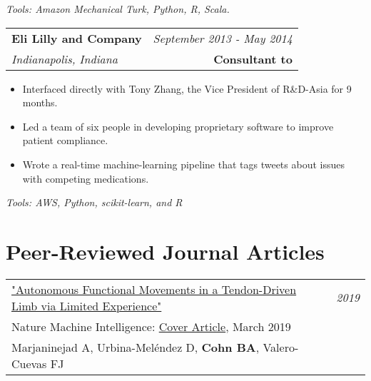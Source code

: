 \documentclass[10pt,a4paper]{article}
\begin{document}
  \vspace*{2mm}\setlength\parindent{2mm}\begin{minipage}{16.8cm}
    \textit{Tools: Amazon Mechanical Turk, Python, R, Scala.}
  \end{minipage}

  \vspace*{3mm}\noindent\begin{tabularx}{17cm}{X r}
    \textbf{Eli Lilly and Company} & \textit{September 2013 - May 2014} \\
    \textit{Indianapolis, Indiana} & \textbf{Consultant to} 
  \end{tabularx}

  \vspace*{1mm}\noindent\begin{minipage}{17cm}
    \begin{itemize}[leftmargin=6mm,topsep=0mm,itemsep=-1mm]
      \item Interfaced directly with Tony Zhang, the Vice President of R\&D-Asia for 9 months.
      \item Led a team of six people in developing proprietary software to improve patient compliance.
      \item Wrote a real-time machine-learning pipeline that tags tweets about issues with competing medications.
    \end{itemize}
  \end{minipage}

  \vspace*{2mm}\setlength\parindent{2mm}\begin{minipage}{16.8cm}
    \textit{Tools: AWS, Python, scikit-learn, and R} 
  \end{minipage}




  \vspace*{3mm}\section*{Peer-Reviewed Journal Articles} 


\vspace*{1mm}\noindent\begin{tabularx}{17cm}{X r}
   \href{https://www.nature.com/articles/s42256-019-0029-0}{
   "Autonomous Functional Movements in a Tendon-Driven Limb via Limited Experience"} & \textit{2019}\\
    Nature Machine Intelligence: \href{https://github.com/bc/resume/blob/master/in_press/nature_machine_intelligence_2019.png}{Cover Article}, March 2019 \\
   Marjaninejad A, Urbina-Mel\'{e}ndez D, \textbf{Cohn BA}, Valero-Cuevas FJ \\[2mm]
\end{tabularx}
\end{document}
